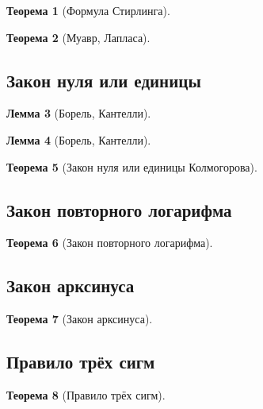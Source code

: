 \documentclass[12pt]{article}
\newtheorem{theorem}{Теорема}
\newtheorem{lemma}[theorem]{Лемма}
\numberwithin{theorem}{section}
\numberwithin{proposition}{section}
\theoremstyle{definition}
\begin{document}
	\begin{theorem}[Формула Стирлинга]
		
	\end{theorem}
	
	\begin{theorem}[Муавр, Лапласа]
		
	\end{theorem}
	
	\subsection{Закон нуля или единицы}
	
	\begin{lemma}[Борель, Кантелли]
		
	\end{lemma}
	
	\begin{lemma}[Борель, Кантелли]
		
	\end{lemma}
	
	\begin{theorem}[Закон нуля или единицы Колмогорова]
		
	\end{theorem}
	
	\subsection{Закон повторного логарифма}
	
	\begin{theorem}[Закон повторного логарифма]
		
	\end{theorem}
	
	\subsection{Закон арксинуса}
	
	\begin{theorem}[Закон арксинуса]
		
	\end{theorem}
	
	\subsection{Правило трёх сигм}
	
	\begin{theorem}[Правило трёх сигм]
		
	\end{theorem}
	
\end{document}

